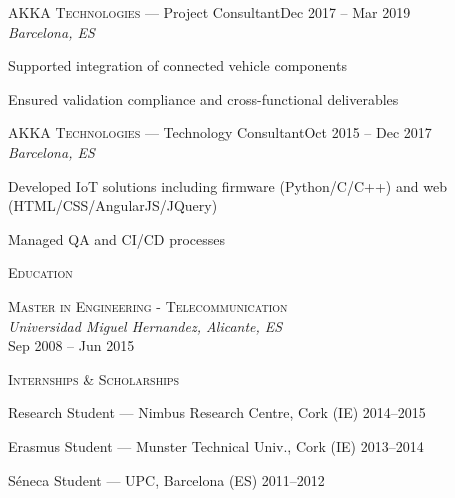 \documentclass[11pt, a4paper]{article}
\newcommand{\headright}[1]{\vspace*{2ex}\textsc{\large\color{cvblue}#1}\par%
  \vspace*{-1.4ex}{\color{cvblue}\hrulefill}\par}
\newlength{\SideBarW}
\newlength{\BetweenJobsGap}
\newlength{\RightColMargin}
\newenvironment{job}[4]{%
  \vspace{\BetweenJobsGap}%
  \noindent\textsc{#1} --- #2\hfill {\small #4}\\%
  {\small\itshape #3}\par
  \begin{list}{--}{%
      \setlength{\leftmargin}{1.4em}%
      \setlength{\labelsep}{0.5em}%
      \setlength{\itemsep}{0.45ex}%
      \setlength{\topsep}{0.2ex}%
      \setlength{\rightmargin}{\RightColMargin}%
      \setlength{\listparindent}{0pt}%
      \setlength{\parsep}{0pt}%
    }%
}{%
  \end{list}%
}
\begin{document}
\begin{minipage}[t]{\dimexpr\textwidth-\SideBarW-3mm\relax}
  \begin{job}{AKKA Technologies}{Project Consultant}{Barcelona, ES}{Dec 2017 -- Mar 2019}
    \item Supported integration of connected vehicle components
    \item Ensured validation compliance and cross-functional deliverables
  \end{job}

  \begin{job}{AKKA Technologies}{Technology Consultant}{Barcelona, ES}{Oct 2015 -- Dec 2017}
    \item Developed IoT solutions including firmware (Python/C/C++) and web (HTML/CSS/AngularJS/JQuery)
    \item Managed QA and CI/CD processes
  \end{job}

  \headright{Education}
  \noindent\textsc{Master in Engineering - Telecommunication} \\
  \textit{Universidad Miguel Hernandez, Alicante, ES} \\
  Sep 2008 -- Jun 2015

  \headright{Internships \& Scholarships}
  \begin{list}{--}{%
      \setlength{\leftmargin}{1.4em}%
      \setlength{\labelsep}{0.5em}%
      \setlength{\itemsep}{0.45ex}%
      \setlength{\topsep}{0.2ex}%
      \setlength{\rightmargin}{\RightColMargin}%
      \setlength{\listparindent}{0pt}%
      \setlength{\parsep}{0pt}%
    }
    \item Research Student --- Nimbus Research Centre, Cork (IE) \hfill 2014--2015
    \item Erasmus Student --- Munster Technical Univ., Cork (IE) \hfill 2013--2014
    \item Séneca Student --- UPC, Barcelona (ES) \hfill 2011--2012
  \end{list}
\end{minipage}
\end{document}

